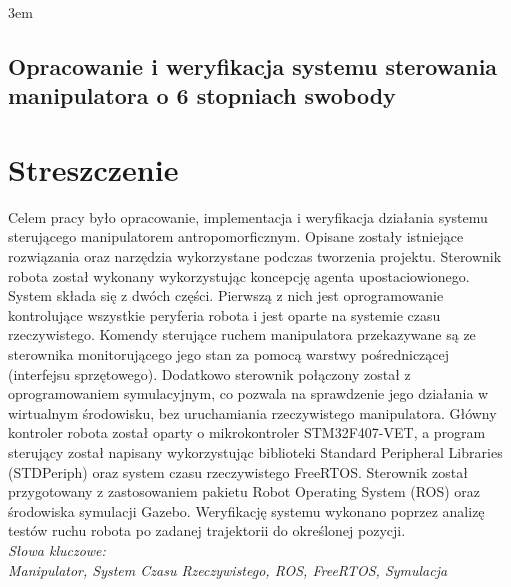 \documentclass[a4paper, 12pt, twoside]{article}
\begin{document}
\emergencystretch 3em

\begin{figure}
\setlength{\voffset}{0cm}
\setlength{\hoffset}{0cm}
	
\setlength{\voffset}{-2.54cm}
\setlength{\hoffset}{-2.54cm}
\end{figure}
\mbox{}
\newpage
\thispagestyle{empty}
\mbox{}

\newpage
\begin{center}
\section*{Opracowanie i weryfikacja systemu sterowania manipulatora o 6 stopniach swobody}
\end{center}

\section*{Streszczenie}
\thispagestyle{empty}
\justify
Celem pracy było opracowanie, implementacja i weryfikacja działania systemu sterującego manipulatorem antropomorficznym. Opisane zostały istniejące rozwiązania oraz narzędzia wykorzystane podczas tworzenia projektu. Sterownik robota został wykonany wykorzystując koncepcję agenta upostaciowionego. System składa się z dwóch części. Pierwszą z nich jest oprogramowanie kontrolujące wszystkie peryferia robota i jest oparte na systemie czasu rzeczywistego. Komendy sterujące ruchem manipulatora przekazywane są ze sterownika monitorującego jego stan za pomocą warstwy pośredniczącej (interfejsu sprzętowego). Dodatkowo sterownik połączony został z oprogramowaniem symulacyjnym, co pozwala na sprawdzenie jego działania w wirtualnym środowisku, bez uruchamiania rzeczywistego manipulatora. Główny kontroler robota został oparty o mikrokontroler STM32F407-VET, a program sterujący został napisany wykorzystując biblioteki Standard Peripheral Libraries (STDPeriph) oraz system czasu rzeczywistego FreeRTOS. Sterownik został przygotowany z zastosowaniem pakietu Robot Operating System (ROS) oraz środowiska symulacji Gazebo. Weryfikację systemu wykonano poprzez analizę testów ruchu robota po zadanej trajektorii do określonej pozycji.
\vspace{0.5 cm}
\\
\textit{Słowa kluczowe:}
\\
\textit{Manipulator, System Czasu Rzeczywistego, ROS, FreeRTOS, Symulacja}
\end{document}
